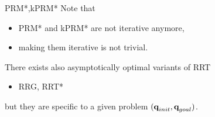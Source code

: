 %
%

\begin{frame} {PRM*,kPRM*}
  Note that
  \begin{itemize}
  \item PRM* and kPRM* are not iterative anymore,
  \item making them iterative is not trivial.
  \end{itemize}
\end{frame}

%
%

\begin{frame}
  There exists also asymptotically optimal variants of RRT
  \begin{itemize}
    \item RRG, RRT*
  \end{itemize}
  but they are specific to a given problem $(\textbf{q}_{init},\textbf{q}_{goal})$.
\end{frame}
